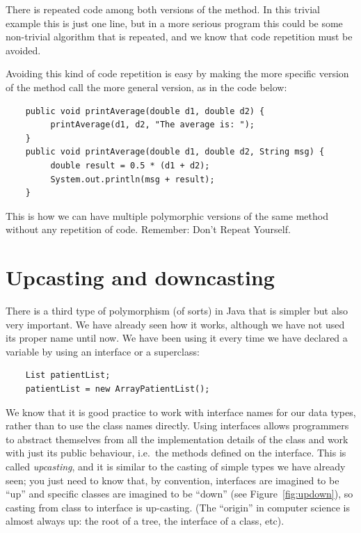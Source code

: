 There is repeated code among both versions of the method. In this
trivial example this is just one line, but in a more serious program
this could be some non-trivial algorithm that is repeated, and we know
that code repetition must be avoided. 

Avoiding this kind of code repetition is easy by making the more
specific version of the method call the more general version, as in
the code below: 

\begin{verbatim}
    public void printAverage(double d1, double d2) {
         printAverage(d1, d2, "The average is: ");
    }
    public void printAverage(double d1, double d2, String msg) {
         double result = 0.5 * (d1 + d2);
         System.out.println(msg + result);
    }
\end{verbatim}

This is how we can have multiple polymorphic versions of the same
method without any repetition of code. Remember: Don't Repeat
Yourself. 

\section{Upcasting and downcasting}
\label{sec:upcasting}

There is a third type of
polymorphism (of sorts) in Java that is simpler but also very
important. 
We have
already seen how it works, although we have not used its proper name
until now.
We have been using it every time we have declared
a variable by using an interface or a superclass: 

\begin{verbatim}
    List patientList;
    patientList = new ArrayPatientList();
\end{verbatim}

We know that it is good practice to work with interface names for our
data types, rather than to use the class names directly. Using interfaces
allows programmers to abstract themselves from all the implementation details
of the class and work with just its public behaviour, i.e.~the methods
defined on the interface. This is called \emph{upcasting}, and it is similar to the
casting of simple types we have already seen; you just need to know
that, by convention, interfaces are imagined to be ``up'' and specific
classes are imagined to be ``down'' (see Figure~\ref{fig:updown}), so casting from class to
interface is up-casting. (The ``origin'' in computer science is almost
always up: the root of a tree, the interface of a class, etc). 

